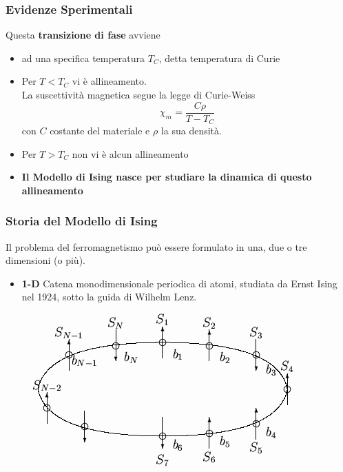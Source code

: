 \documentclass[11pt]{beamer}
\begin{document}
\begin{frame}
	\frametitle{Evidenze Sperimentali}
Questa  \textbf{transizione di fase} avviene
\begin{itemize}
\item<1->{ ad una specifica temperatura $T_C$, detta temperatura di Curie}
\item<2->{Per $T<T_C$ vi è allineamento.\\
La suscettività magnetica segue la legge di Curie-Weiss
$$ \chi_m = \frac{C \rho}{T-T_C} $$
con $C$ costante del materiale e $\rho$ la sua densità.
}
\item<3->{Per $T>T_C$ non vi è alcun allineamento}
\item<4->{\textbf{Il Modello di Ising nasce per studiare la dinamica di questo allineamento}}
\end{itemize}
\end{frame}

\begin{frame}
	\frametitle{Storia del Modello di Ising}
Il problema del ferromagnetismo può essere formulato in una, due o tre dimensioni (o più).
	\begin{itemize}
	\item{\textbf{1-D} Catena monodimensionale periodica di atomi, studiata da Ernst Ising nel 1924, sotto la guida di Wilhelm Lenz.}
	\end{itemize}
	\begin{figure}[r]
	\centering
	\includegraphics[width=0.6\columnwidth]{pt3}

	\label{fig1}
	\end{figure}
	

\end{frame}
\end{document}
